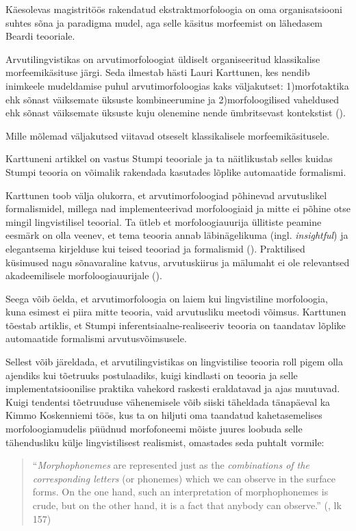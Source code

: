 \documentclass[12pt,a4paper]{article}
\begin{document}
Käesolevas magistritöös rakendatud ekstraktmorfoloogia on oma organisatsiooni suhtes sõna ja paradigma mudel, aga selle käsitus morfeemist on lähedasem Beardi teooriale.

Arvutilingvistikas on arvutimorfoloogiat üldiselt organiseeritud klassikalise morfeemi\-käsituse järgi. Seda ilmestab hästi 
Lauri Karttunen, kes nendib inimkeele mudeldamise puhul arvutimorfoloogias kaks väljakutset: 1)\nobreakspace morfotaktika ehk sõnast väiksemate üksuste kombineerumine ja 2)\nobreakspace morfoloogilised vaheldused ehk sõnast väiksemate üksuste kuju olenemine nende ümbritsevast kontekstist (\cite{karttunen_computing_2003}).

Mille mõlemad väljakutsed viitavad otseselt klassikalisele morfeemi\-käsitusele.

Karttuneni artikkel on vastus Stumpi teooriale ja ta näitlikustab selles kuidas Stumpi teooria on võimalik rakendada kasutades lõplike automaatide formalismi.

Karttunen toob välja olukorra, et arvuti\-morfoloogiad põhinevad arvutuslikel formalismidel, millega nad implementeerivad morfoloogiaid ja mitte ei põhine otse mingil lingvistilisel teoorial. Ta ütleb et morfoloogia\-uurija üllitiste peamine eesmärk on olla veenev, et tema teooria annab läbinägelikuma (ingl. \textit{insightful}) ja elegantsema kirjelduse kui teised teooriad ja formalismid (\cite[2]{karttunen_computing_2003}). Praktilised küsimused nagu sõnavaraline katvus, arvutus\-kiirus ja mälu\-maht ei ole relevantsed akadeemilisele morfoloogia\-uurijale (\cite[2]{karttunen_computing_2003}).

Seega võib öelda, et arvutimorfoloogia on laiem kui lingvistiline morfoloogia, kuna esimest ei piira mitte teooria, vaid arvutusliku meetodi võimsus. Karttunen tõestab artiklis, et Stumpi inferentsiaalne-realiseeriv teooria on taandatav lõplike automaatide formalismi arvutusvõimsusele.%

Sellest võib järeldada, et arvutilingvistikas on lingvistilise teooria roll pigem olla ajendiks kui tõetruuks postulaadiks, kuigi kindlasti on teooria ja selle implementatsioonilise praktika vahekord raskesti eraldatavad ja ajas muutuvad. Kuigi tendentsi tõetruuduse vähenemisele võib siiski täheldada tänapäeval ka Kimmo Koskenniemi töös, kus ta on hiljuti oma taandatud kahetasemelises morfoloogiamudelis püüdnud morfofoneemi mõiste juures loobuda selle tähendusliku külje lingvistilisest realismist, omastades seda puhtalt vormile:
\begin{quote}
  ``\textit{Morphophonemes} are represented just as the \textit{combinations of the corresponding letters} (or phonemes) which we can observe in the surface forms. On the one hand, such an interpretation of morphophonemes is crude, but on the other hand, it is a fact that anybody can observe.'' (\cite{koskenniemi_informal_2013}, lk 157)
\end{quote}
\end{document}
